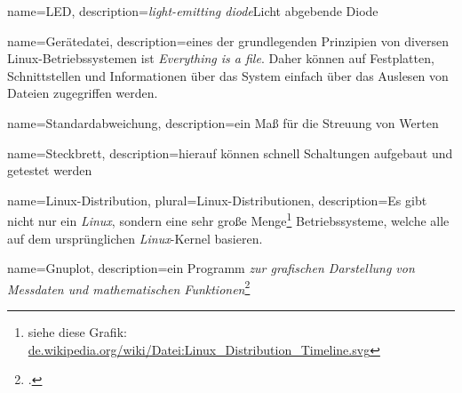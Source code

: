 {
  name=LED,
  description={\emph{light-emitting diode}\newline Licht abgebende Diode}
}

{
  name=Gerätedatei,
  description={eines der grundlegenden Prinzipien von diversen Linux-Betriebssystemen ist \emph{Everything is a file}.\newline
  Daher können auf Festplatten, Schnittstellen und Informationen über das System einfach über das Auslesen von Dateien zugegriffen werden.
  }
}

{
  name=Standardabweichung,
  description={ein Maß für die Streuung von Werten}
}

{
  name=Steckbrett,
  description={hierauf können schnell Schaltungen aufgebaut und getestet werden}
}

{
  name=Linux-Distribution,
  plural=Linux-Distributionen,
  description={Es gibt nicht nur ein \emph{Linux}, sondern eine sehr große Menge\footnote{siehe diese Grafik: \href{http://de.wikipedia.org/wiki/Datei:Linux_Distribution_Timeline.svg}{de.wikipedia.org/wiki/Datei:Linux\_Distribution\_Timeline.svg}} Betriebssysteme, welche alle auf dem ursprünglichen \emph{Linux}-Kernel basieren.}
}

{
  name=Gnuplot,
  description={ein Programm \emph{zur grafischen Darstellung von Messdaten und mathematischen Funktionen}\footcite{wiki:gnuplot}}
}
